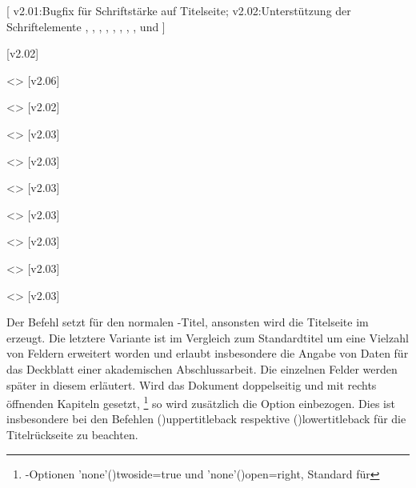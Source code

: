 \begin{DeclareEntity*}{}
\begin{DeclareEntity*}{}
\begin{DeclareEntity*}{}
\begin{Declaration}
  {}
[%
  v2.01:Bugfix für Schriftstärke auf Titelseite;%
  v2.02:Unterstützung der Schriftelemente , 
    , , , , 
    , , , 
     und %
]
\begin{Declaration}
  {}
  [v2.02]
\begin{Declaration}
  {}
  <>
  [v2.06]
\begin{Declaration}
  {}
  <>
  [v2.02]
\begin{Declaration}
  {}
  <>
  [v2.03]
\begin{Declaration}
  {}
  <>
  [v2.03]
\begin{Declaration}
  {}
  <>
  [v2.03]
\begin{Declaration}
  {}
  <>
  [v2.03]
\begin{Declaration}
  {}
  <>
  [v2.03]
\begin{Declaration}
  {}
  <>
  [v2.03]
\begin{Declaration}
  {}
  <>
  [v2.03]

Der Befehl  setzt für  den normalen 
\KOMAScript-Titel, ansonsten wird die Titelseite im \TUDCD erzeugt. Die 
letztere Variante ist im Vergleich zum Standardtitel um eine Vielzahl von 
Feldern erweitert worden und erlaubt insbesondere die Angabe von Daten für das 
Deckblatt einer akademischen Abschlussarbeit. Die einzelnen Felder werden 
später in diesem \autorefname erläutert. Wird das Dokument doppelseitig und mit 
rechts öffnenden Kapiteln gesetzt,%
\footnote{%
  \KOMAScript-Optionen \Option'none'(){twoside=true} und 
  \Option'none'(){open=right}, Standard für 
}
so wird zusätzlich die Option  einbezogen. Dies 
ist insbesondere bei den Befehlen \Macro(){uppertitleback} 
respektive \Macro(){lowertitleback} für die Titelrückseite 
zu beachten.


\end{Declaration}
\end{Declaration}
\end{Declaration}
\end{Declaration}
\end{Declaration}
\end{Declaration}
\end{Declaration}
\end{Declaration}
\end{Declaration}
\end{Declaration}
\end{Declaration}
\end{DeclareEntity*}
\end{DeclareEntity*}
\end{DeclareEntity*}
